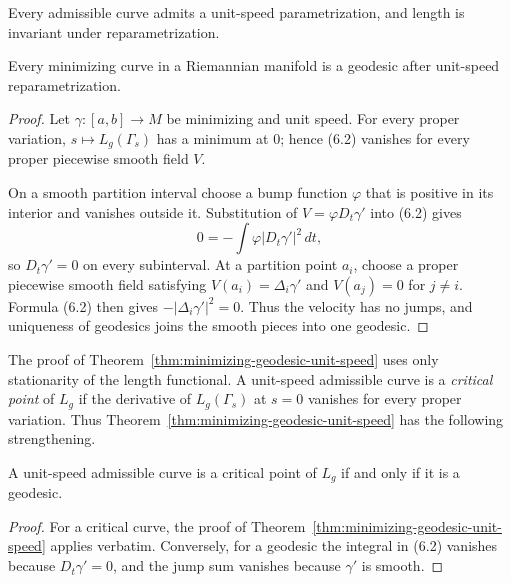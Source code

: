 Every admissible curve admits a unit-speed parametrization, and length is
invariant under reparametrization.

\begin{theorem}
\label{thm:minimizing-geodesic-unit-speed}

Every minimizing curve in a Riemannian manifold is a geodesic after
unit-speed reparametrization.
\end{theorem}

\begin{proof}
\sketch
Let $\gamma:[a,b]\to M$ be minimizing and unit speed.  For every proper
variation, $s\mapsto L_g(\Gamma_s)$ has a minimum at $0$; hence (6.2)
vanishes for every proper piecewise smooth field $V$.

On a smooth partition interval choose a bump function $\varphi$ that is
positive in its interior and vanishes outside it.  Substitution of
$V=\varphi D_t\gamma'$ into (6.2) gives
\[
0=-\int\varphi|D_t\gamma'|^2\,dt,
\]
so $D_t\gamma'=0$ on every subinterval.  At a partition point $a_i$, choose
a proper piecewise smooth field satisfying
$V(a_i)=\Delta_i\gamma'$ and $V(a_j)=0$ for $j\ne i$.  Formula (6.2) then
gives $-|\Delta_i\gamma'|^2=0$.  Thus the velocity has no jumps, and uniqueness
of geodesics joins the smooth pieces into one geodesic.
\end{proof}

The proof of Theorem~\ref{thm:minimizing-geodesic-unit-speed} uses only
stationarity of the length functional.  A unit-speed admissible curve is a
\emph{critical point} of $L_g$ if the derivative of $L_g(\Gamma_s)$ at $s=0$
vanishes for every proper variation.  Thus
Theorem~\ref{thm:minimizing-geodesic-unit-speed} has the following
strengthening.

\begin{corollary}
\label{cor:critical-point-geodesic}

A unit-speed admissible curve is a critical point of $L_g$ if and only if it
is a geodesic.
\end{corollary}

\begin{proof}
\sketch
For a critical curve, the proof of
Theorem~\ref{thm:minimizing-geodesic-unit-speed} applies verbatim.  Conversely,
for a geodesic the integral in (6.2) vanishes because $D_t\gamma'=0$, and the
jump sum vanishes because $\gamma'$ is smooth.
\end{proof}

